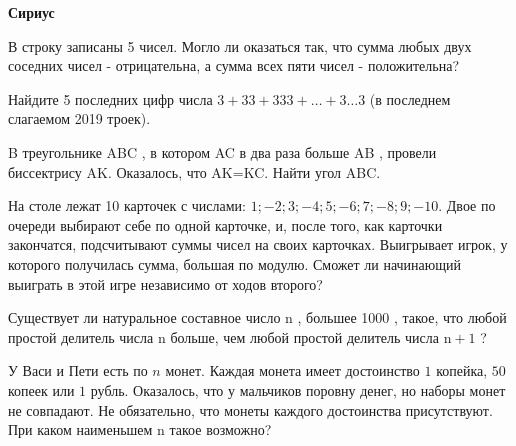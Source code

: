\centerline{\bf \Huge Сириус}


\begin{flushright}
        \scriptsize{}
\end{flushright}


В строку записаны 5 чисел. Могло ли оказаться так, что сумма любых двух соседних чисел - отрицательна, а сумма всех пяти чисел - положительна?

Найдите 5 последних цифр числа $3+33+333+\ldots+3 \ldots 3$ (в последнем слагаемом 2019 троек).

B треугольнике ABC , в котором AC в два раза больше AB , провели биссектрису AK. Оказалось, что AK=KC. Найти угол ABC.


На столе лежат 10 карточек с числами: $1 ;-2 ; 3 ;-4 ; 5 ;-6 ; 7 ;-8 ; 9 ;-10$. Двое по очереди выбирают себе по одной карточке, и, после того, как карточки закончатся, подсчитывают суммы чисел на своих карточках. Выигрывает игрок, у которого получилась сумма, большая по модулю. Сможет ли начинающий выиграть в этой игре независимо от ходов второго?

Существует ли натуральное составное число n , большее 1000 , такое, что любой простой делитель числа n больше, чем любой простой делитель числа $\mathrm{n}+1$ ?

У Васи и Пети есть по $n$ монет. Каждая монета имеет достоинство $1$ копейка, $50$ копеек или $1$ рубль. Оказалось, что у мальчиков поровну денег, но наборы монет не совпадают. Не обязательно, что монеты каждого достоинства присутствуют. При каком наименьшем n такое возможно?